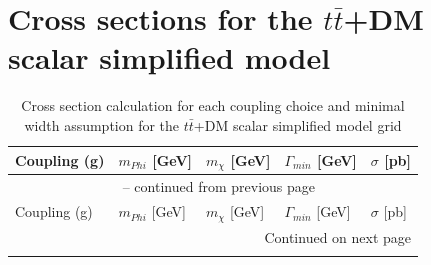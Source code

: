 \section{\texorpdfstring{Cross sections for the $t\bar t$+DM scalar simplified model}{Cross sections for the ttbar+DM scalar simplified model}}

\begin{longtable}{lllll}
	\caption{Cross section calculation for each coupling choice and minimal width assumption for the $t\bar t$+DM scalar simplified model grid}\\
	\toprule
	Coupling (g) & $m_{Phi}$ [GeV] & $m_{\chi}$ [GeV] & $\Gamma_{min}$ [GeV] & $\sigma$ [pb]\\
	\midrule
	\endfirsthead
	
	\multicolumn{5}{c}{\tablename\ \thetable{} -- continued from previous page} \\
	Coupling (g) & $m_{Phi}$ [GeV] & $m_{\chi}$ [GeV] & $\Gamma_{min}$ [GeV] & $\sigma$ [pb]\\
	\midrule
	\endhead
	
	\midrule
	\multicolumn{5}{r}{{Continued on next page}} \\ 
	\endfoot
	

\end{longtable}
